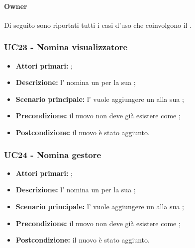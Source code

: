 \documentclass[casi-duso]{subfiles}
\begin{document}
\paragraph{Owner}
Di seguito sono riportati tutti i casi d'uso che coinvolgono il  .

\subsubsection{UC23 - Nomina visualizzatore}
\label{subsub:UC23}
\begin{itemize}
  \item \textbf{Attori primari:} ;
  \item \textbf{Descrizione:} l'  nomina un  per la sua ;
  \item \textbf{Scenario principale:} l'  vuole aggiungere un  alla sua ;
  \item \textbf{Precondizione:} il nuovo  non deve già esistere come ;
  \item \textbf{Postcondizione:} il nuovo  è stato aggiunto.
\end{itemize}

\subsubsection{UC24 - Nomina gestore}
\label{subsub:UC24}
\begin{itemize}
  \item \textbf{Attori primari:} ;
  \item \textbf{Descrizione:} l'  nomina un  per la sua ;
  \item \textbf{Scenario principale:} l'  vuole aggiungere un  alla sua ;
  \item \textbf{Precondizione:} il nuovo  non deve già esistere come ;
  \item \textbf{Postcondizione:} il nuovo  è stato aggiunto.
\end{itemize}
\end{document}
